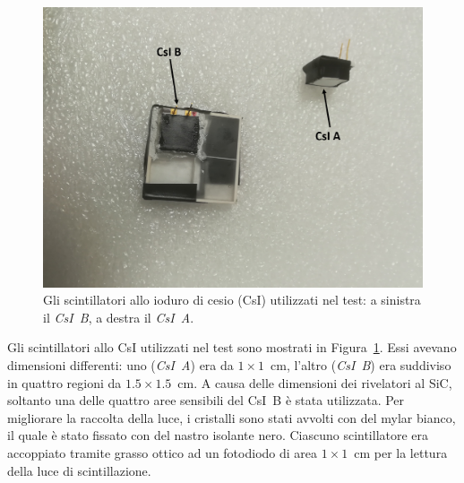 

\begin{figure} [!t]
	\centering
	\includegraphics[width=\textwidth, keepaspectratio]{Grafici/csi_etichette.png}
	\caption{Gli scintillatori allo ioduro di cesio (CsI) utilizzati nel test: a sinistra il \emph{CsI~B}, a destra il \emph{CsI~A}.} \label{fig:csi}
\end{figure}



Gli scintillatori allo CsI utilizzati nel test sono mostrati in Figura~\ref{fig:csi}.
Essi avevano dimensioni differenti: uno (\emph{CsI~A}) era da $1 \times 1$~cm, l'altro (\emph{CsI~B}) era suddiviso in quattro regioni da $1.5 \times 1.5$~cm. 
A causa delle dimensioni dei rivelatori al SiC, soltanto una delle quattro aree sensibili del CsI~B è stata utilizzata. Per migliorare la raccolta della luce, i cristalli sono stati avvolti con del mylar bianco, il quale è stato fissato con del nastro isolante nero.
%
%
Ciascuno scintillatore era accoppiato tramite grasso ottico ad un fotodiodo di area $1 \times 1$~cm per la lettura della luce di scintillazione. 



